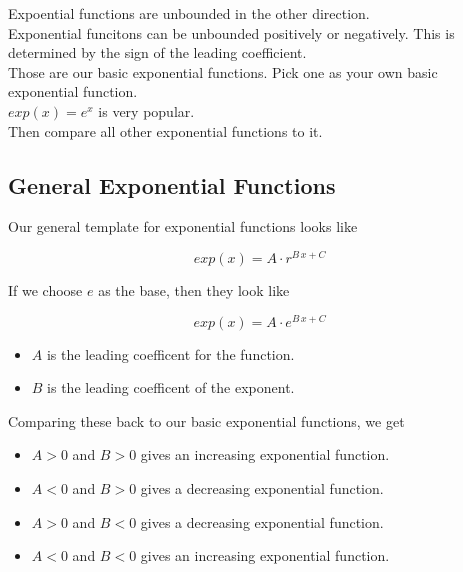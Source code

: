 \documentclass{ximera}
\begin{document}
Expoential functions are unbounded in the other direction. \\


Exponential funcitons can be unbounded positively or negatively. This is determined by the sign of the leading coefficient. \\




Those are our basic exponential functions.  Pick one as your own basic exponential function. \\



$exp(x) = e^x$ is very popular. \\


Then compare all other exponential functions to it.





\subsection*{General Exponential Functions}



Our general template for exponential functions looks like

\[
exp(x) = A \cdot r^{B \, x + C}
\]

If we choose $e$ as the base, then they look like


\[
exp(x) = A \cdot e^{B \, x + C}
\]


\begin{itemize}
  \item $A$ is the leading coefficent for the function.
  \item $B$ is the leading coefficent of the exponent.
\end{itemize}


Comparing these back to our basic exponential functions, we get



\begin{itemize}
  \item $A > 0$ and $B > 0$ gives an increasing exponential function.
  \item $A < 0$ and $B > 0$ gives a decreasing exponential function.
  \item $A > 0$ and $B < 0$ gives a decreasing exponential function.
  \item $A < 0$ and $B < 0$ gives an increasing exponential function.
\end{itemize}
\end{document}
